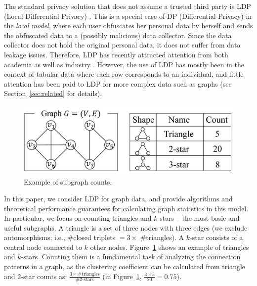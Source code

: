 The standard privacy solution that does not assume a trusted third party is LDP (Local Differential Privacy) \cite{Duchi_FOCS13,Kasiviswanathan_FOCS08}. 
This is a special case of DP 
(Differential Privacy) 
in the \textit{local model}, where each user obfuscates her personal data by herself and sends the obfuscated data to a (possibly malicious) data collector. 
Since the data collector does not hold the original personal data, it does not suffer from data leakage issues. 
Therefore, LDP has recently attracted attention from both academia \cite{Acharya_AISTATS19,Bassily_STOC15,Bassily_NIPS17,Fanti_PoPETs16,Kairouz_ICML16,Kairouz_JMLR16,Murakami_USENIX19,Qin_CCS16,Wang_USENIX17,Ye_ISIT17} as well as industry \cite{Erlingsson_CCS14,Ding_NIPS17,Thakurta_USPatent17}. 
However, the use of LDP has mostly been in the context of tabular data where each row corresponds to an individual, and little attention has been paid to LDP for more complex data such as graphs (see 
Section~\ref{sec:related} for details). 

\begin{figure}
\centering
\includegraphics[width=0.9\linewidth]{fig/subgraph.pdf}
\vspace{-5.8mm}
\caption{Example of subgraph counts.}
\label{fig:subgraph}
\end{figure}

In this paper, we consider LDP for graph data, and 
provide algorithms and theoretical performance guarantees
for calculating graph statistics in this model. 
In particular, we focus on counting triangles and $k$-stars -- the most basic and useful subgraphs. 
A triangle is a set of three nodes with three edges (we exclude automorphisms; i.e., \#closed triplets $= 3 \times$ \#triangles). 
A $k$-star consists of a central node connected to $k$ other nodes. 
Figure~\ref{fig:subgraph} shows an example of triangles and $k$-stars. 
Counting them is a fundamental task of analyzing the connection patterns in a graph, as 
the clustering coefficient can be calculated from triangle and $2$-star counts as: $\frac{3 \times \text{\#triangles}}{\#2\text{-stars}}$ (in Figure~\ref{fig:subgraph}, $\frac{3 \times 5}{20} = 0.75$). 

